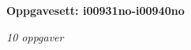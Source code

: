 \centerline{\bf Oppgavesett: i00931no-i00940no}
\vskip 10pt
\centerline{\it 10 oppgaver}\vskip 10pt
\vskip 10pt
